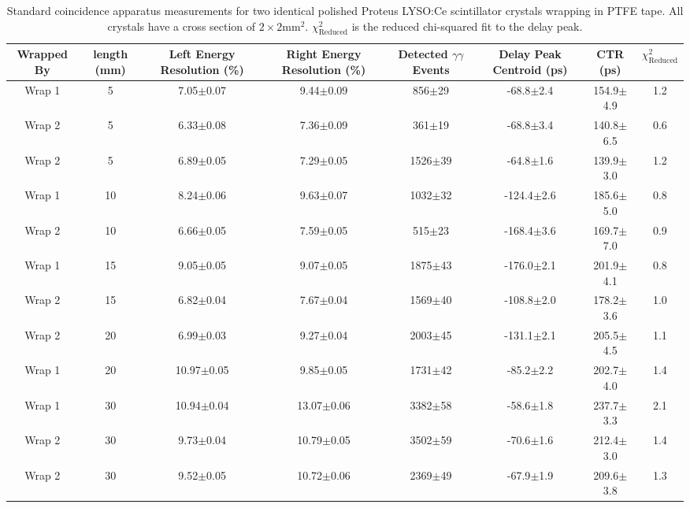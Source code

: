 \begin{table}
\caption{\label{tab:standardctr} Standard coincidence apparatus measurements for two identical polished Proteus LYSO:Ce scintillator crystals wrapping in PTFE tape. All crystals have a cross section of $2\times2$mm$^2$. $\chi^2_\text{Reduced}$ is the reduced chi-squared fit to the delay peak.}
\begin{tabular}{cccccccc}
\hline
Wrapped By &  length (mm) & Left Energy Resolution (\%) & Right Energy Resolution (\%) & Detected $\gamma\gamma$ Events & Delay Peak Centroid (ps) & CTR (ps) &  $\chi^2_\text{Reduced}$ \\
\hline
    Wrap 1 &      5 &   7.05$\pm$0.07 &   9.44$\pm$0.09 &   856$\pm$29 &   -68.8$\pm$2.4 &  154.9$\pm$4.9 &        1.2 \\
    Wrap 2 &      5 &   6.33$\pm$0.08 &   7.36$\pm$0.09 &   361$\pm$19 &   -68.8$\pm$3.4 &  140.8$\pm$6.5 &        0.6 \\
    Wrap 2 &      5 &   6.89$\pm$0.05 &   7.29$\pm$0.05 &  1526$\pm$39 &   -64.8$\pm$1.6 &  139.9$\pm$3.0 &        1.2 \\
    Wrap 1 &     10 &   8.24$\pm$0.06 &   9.63$\pm$0.07 &  1032$\pm$32 &  -124.4$\pm$2.6 &  185.6$\pm$5.0 &        0.8 \\
    Wrap 2 &     10 &   6.66$\pm$0.05 &   7.59$\pm$0.05 &   515$\pm$23 &  -168.4$\pm$3.6 &  169.7$\pm$7.0 &        0.9 \\
    Wrap 1 &     15 &   9.05$\pm$0.05 &   9.07$\pm$0.05 &  1875$\pm$43 &  -176.0$\pm$2.1 &  201.9$\pm$4.1 &        0.8 \\
    Wrap 2 &     15 &   6.82$\pm$0.04 &   7.67$\pm$0.04 &  1569$\pm$40 &  -108.8$\pm$2.0 &  178.2$\pm$3.6 &        1.0 \\
    Wrap 2 &     20 &   6.99$\pm$0.03 &   9.27$\pm$0.04 &  2003$\pm$45 &  -131.1$\pm$2.1 &  205.5$\pm$4.5 &        1.1 \\
    Wrap 1 &     20 &  10.97$\pm$0.05 &   9.85$\pm$0.05 &  1731$\pm$42 &   -85.2$\pm$2.2 &  202.7$\pm$4.0 &        1.4 \\
    Wrap 1 &     30 &  10.94$\pm$0.04 &  13.07$\pm$0.06 &  3382$\pm$58 &   -58.6$\pm$1.8 &  237.7$\pm$3.3 &        2.1 \\
    Wrap 2 &     30 &   9.73$\pm$0.04 &  10.79$\pm$0.05 &  3502$\pm$59 &   -70.6$\pm$1.6 &  212.4$\pm$3.0 &        1.4 \\
    Wrap 2 &     30 &   9.52$\pm$0.05 &  10.72$\pm$0.06 &  2369$\pm$49 &   -67.9$\pm$1.9 &  209.6$\pm$3.8 &        1.3 \\

\hline
\end{tabular}
\end{table}


